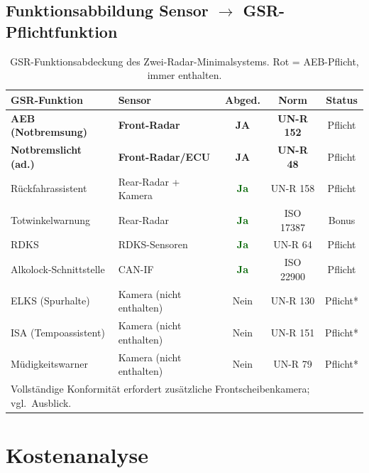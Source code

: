 \documentclass[a4paper,12pt]{article}
\theoremstyle{definition}
\begin{document}
\subsection{Funktionsabbildung Sensor $\to$ GSR-Pflichtfunktion}

\begin{table}[H]
\centering
\caption{GSR-Funktionsabdeckung des Zwei-Radar-Minimalsystems.
\textcolor{accentred}{Rot} = AEB-Pflicht, immer enthalten.}
\label{tab:abdeckung}
\renewcommand{\arraystretch}{1.35}
\begin{tabular}{@{}llccc@{}}
\toprule
\textbf{GSR-Funktion} & \textbf{Sensor} & \textbf{Abged.}
  & \textbf{Norm} & \textbf{Status}\\
\midrule
\rowcolor{lightred}
\textbf{AEB (Notbremsung)} & \textbf{Front-Radar}
  & \textcolor{accentred}{\textbf{JA}}
  & \textbf{UN-R 152}
  & \textcolor{accentred}{Pflicht} \\
\rowcolor{lightred}
\textbf{Notbremslicht (ad.)} & \textbf{Front-Radar/ECU}
  & \textcolor{accentred}{\textbf{JA}}
  & \textbf{UN-R 48}
  & \textcolor{accentred}{Pflicht} \\
R\"uckfahrassistent  & Rear-Radar + Kamera
  & \textcolor{darkgreen}{\textbf{Ja}} & UN-R 158 & Pflicht\\
Totwinkelwarnung & Rear-Radar
  & \textcolor{darkgreen}{\textbf{Ja}} & ISO 17387 & Bonus\\
RDKS & RDKS-Sensoren
  & \textcolor{darkgreen}{\textbf{Ja}} & UN-R 64 & Pflicht\\
Alkolock-Schnittstelle & CAN-IF
  & \textcolor{darkgreen}{\textbf{Ja}} & ISO 22900 & Pflicht\\
\midrule
ELKS (Spurhalte) & Kamera (nicht enthalten)
  & \textcolor{accentred}{Nein} & UN-R 130 & Pflicht*\\
ISA (Tempoassistent) & Kamera (nicht enthalten)
  & \textcolor{accentred}{Nein} & UN-R 151 & Pflicht*\\
M\"udigkeitswarner & Kamera (nicht enthalten)
  & \textcolor{accentred}{Nein} & UN-R 79 & Pflicht*\\
\bottomrule
\multicolumn{5}{l}{\small * Vollst\"andige Konformit\"at erfordert zus\"atzliche Frontscheibenkamera; vgl.\ Ausblick.}
\end{tabular}
\end{table}

\section{Kostenanalyse}
\label{sec:kosten}
\end{document}
